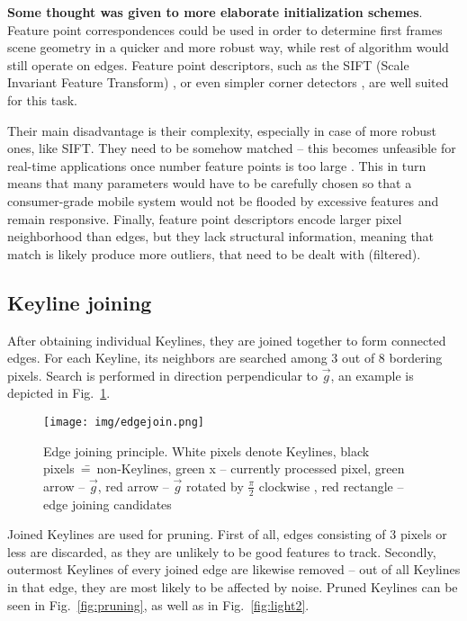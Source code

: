 \textbf{Some thought was given to more elaborate initialization schemes}. Feature point correspondences could be used in order to determine first frames scene geometry \cite{semi_dense} in a quicker and more robust way, while rest of algorithm would still operate on edges. Feature point descriptors, such as the SIFT (Scale Invariant Feature Transform) \cite{sift}, or even simpler corner detectors \cite{harris} \cite{shi1994good}, are well suited for this task.

Their main disadvantage is their complexity, especially in case of more robust ones, like SIFT. They need to be somehow matched -- this becomes unfeasible for real-time applications once number feature points is too large \cite{szczesny}. This in turn means that many parameters would have to be carefully chosen so that a consumer-grade mobile system would not be flooded by excessive features and remain responsive. Finally, feature point descriptors encode larger pixel neighborhood than edges, but they lack structural information, meaning that match is likely produce more outliers, that need to be dealt with (filtered).


\subsection{Keyline joining}
\label{sec:joining}

After obtaining individual Keylines, they are joined together to form connected edges.
For each Keyline, its neighbors are searched among 3 out of 8 bordering pixels. Search is performed in direction perpendicular to $\vec{g}$, an example is depicted in Fig.~\ref{fig:edgejoin}.

\begin{figure}[ht]
	\centering\texttt{[image: img/edgejoin.png]}
	\caption{ Edge joining principle. White pixels denote Keylines, black pixels~\==~non-Keylines, green x -- currently processed pixel, green arrow -- $\vec{g}$, red arrow -- $\vec{g}$ rotated by $\frac{\pi}{2}$ clockwise , red rectangle -- edge joining candidates }
	\label{fig:edgejoin}
\end{figure}


Joined Keylines are used for pruning. First of all, edges consisting of 3 pixels or less are discarded, as they are unlikely to be good features to track. Secondly, outermost Keylines of every joined edge are likewise removed -- out of all Keylines in that edge, they are most likely to be affected by noise. Pruned Keylines can be seen in Fig.~\ref{fig:pruning}, as well as in Fig.~\ref{fig:light2}.

